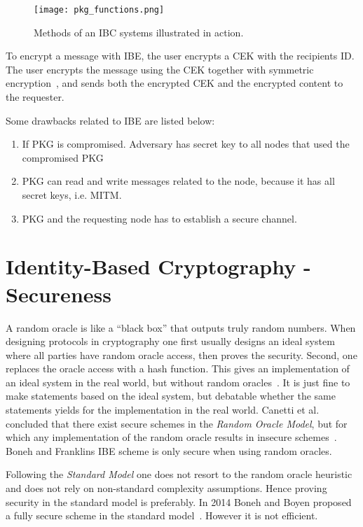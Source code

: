 \begin{figure}[ht]
  \centering
  \texttt{[image: pkg\_functions.png]}
  \caption{Methods of an IBC systems illustrated in action.}
  \label{fig:pkg_functions}
\end{figure}

To encrypt a message with \gls{IBE}, the user encrypts a \gls{CEK} with the recipients \gls{ID}.
The user encrypts the message using the \gls{CEK} together with symmetric encryption~\cite[section 2.2.2]{rfc5408}, and sends both the encrypted \gls{CEK} and the encrypted content to the requester. 

Some drawbacks related to \gls{IBE} are listed below:
\begin{enumerate}
	\item If \gls{PKG} is compromised. Adversary has secret key to all nodes that used the compromised \gls{PKG}
	\item \gls{PKG} can read and write messages related to the node, because it has all secret keys, i.e. \gls{MITM}.
	\item \gls{PKG} and the requesting node has to establish a secure channel. 
\end{enumerate}

\section{Identity-Based Cryptography - Secureness}

A random oracle is like a ``black box'' that outputs truly random numbers.
When designing protocols in cryptography one first usually designs an ideal system where all parties have random oracle access, then proves the security.
Second, one replaces the oracle access with a hash function.
This gives an implementation of an ideal system in the real world, but without random oracles~\cite{DBLP:conf/ccs/BellareR93}. 
It is just fine to make statements based on the ideal system, but debatable whether the same statements yields for the implementation in the real world.
Canetti et al. concluded that there exist secure schemes in the \textit{Random Oracle Model}, but for which any implementation of the random oracle results in insecure schemes~\cite{DBLP:journals/jacm/CanettiGH04}.
Boneh and Franklins \gls{IBE} scheme is only secure when using random oracles.

Following the \textit{Standard Model} one does not resort to the random oracle heuristic and does not rely on non-standard complexity assumptions.
Hence proving security in the standard model is preferably.
In 2014 Boneh and Boyen proposed a fully secure scheme in the standard model~\cite{DBLP:conf/crypto/BonehB04}.
However it is not efficient. 

